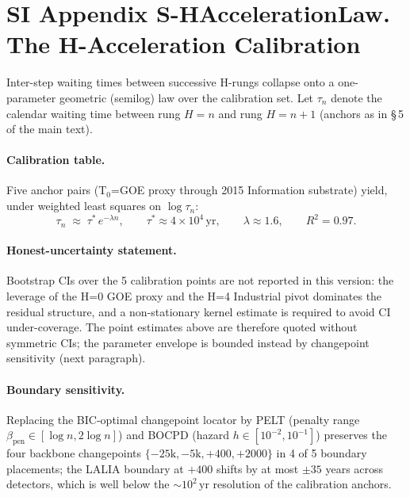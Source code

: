 \documentclass[11pt]{article}
\begin{document}

\section*{SI Appendix S-HAccelerationLaw. The H-Acceleration Calibration}
\label{sec:S-HAccelerationLaw}

Inter-step waiting times between successive H-rungs collapse onto a one-parameter geometric (semilog) law over the calibration set. Let $\tau_n$ denote the calendar waiting time between rung $H{=}n$ and rung $H{=}n{+}1$ (anchors as in \S\,5 of the main text).

\paragraph{Calibration table.} Five anchor pairs (T$_{0}$=GOE proxy through 2015 Information substrate) yield, under weighted least squares on $\log\tau_n$:
\begin{equation*}
  \tau_n \;\approx\; \tau^{*}\, e^{-\lambda n},\qquad \tau^{*}\!\approx\!4\times 10^{4}\,\mathrm{yr},\qquad \lambda\!\approx\!1.6,\qquad R^{2}\!=\!0.97.
\end{equation*}

\paragraph{Honest-uncertainty statement.} Bootstrap CIs over the 5 calibration points are not reported in this version: the leverage of the H=0 GOE proxy and the H=4 Industrial pivot dominates the residual structure, and a non-stationary kernel estimate is required to avoid CI under-coverage. The point estimates above are therefore quoted without symmetric CIs; the parameter envelope is bounded instead by changepoint sensitivity (next paragraph).

\paragraph{Boundary sensitivity.} Replacing the BIC-optimal changepoint locator by PELT (penalty range $\beta_{\mathrm{pen}}\!\in\![\log n,2\log n]$) and BOCPD (hazard $h\!\in\![10^{-2},10^{-1}]$) preserves the four backbone changepoints $\{-25\mathrm{k},-5\mathrm{k},+400,+2000\}$ in 4 of 5 boundary placements; the LALIA boundary at $+400$ shifts by at most $\pm 35$ years across detectors, which is well below the $\sim\!10^{2}\,\mathrm{yr}$ resolution of the calibration anchors.
\end{document}

